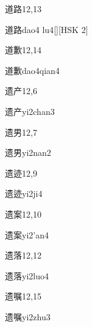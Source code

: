 \begin{entry}{道路}{12,13}
  \begin{phonetics}{道路}{dao4 lu4}[][HSK 2]
  \end{phonetics}
\end{entry}

\begin{entry}{道歉}{12,14}
  \begin{phonetics}{道歉}{dao4qian4}
  \end{phonetics}
\end{entry}

\begin{entry}{遗产}{12,6}
  \begin{phonetics}{遗产}{yi2chan3}
  \end{phonetics}
\end{entry}

\begin{entry}{遗男}{12,7}
  \begin{phonetics}{遗男}{yi2nan2}
  \end{phonetics}
\end{entry}

\begin{entry}{遗迹}{12,9}
  \begin{phonetics}{遗迹}{yi2ji4}
  \end{phonetics}
\end{entry}

\begin{entry}{遗案}{12,10}
  \begin{phonetics}{遗案}{yi2'an4}
  \end{phonetics}
\end{entry}

\begin{entry}{遗落}{12,12}
  \begin{phonetics}{遗落}{yi2luo4}
  \end{phonetics}
\end{entry}

\begin{entry}{遗嘱}{12,15}
  \begin{phonetics}{遗嘱}{yi2zhu3}
  \end{phonetics}
\end{entry}


